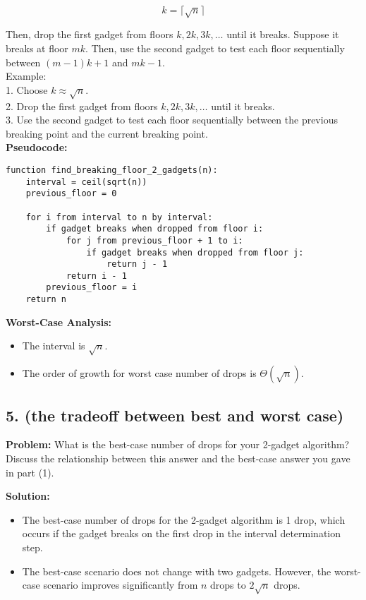\documentclass{article}
\begin{document}
\[
k = \lceil \sqrt{n} \rceil
\]

Then, drop the first gadget from floors \( k, 2k, 3k, \ldots \) until it breaks. Suppose it breaks at floor \( mk \). Then, use the second gadget to test each floor sequentially between \( (m-1)k + 1 \) and \( mk - 1 \).
\\Example:\\
1. Choose \( k \approx \sqrt{n} \).\\
2. Drop the first gadget from floors \( k, 2k, 3k, \ldots \) until it breaks.\\
3. Use the second gadget to test each floor sequentially between the previous breaking point and the current breaking point.
\textbf{\\Pseudocode:}
\begin{verbatim}
function find_breaking_floor_2_gadgets(n):
    interval = ceil(sqrt(n))
    previous_floor = 0

    for i from interval to n by interval:
        if gadget breaks when dropped from floor i:
            for j from previous_floor + 1 to i:
                if gadget breaks when dropped from floor j:
                    return j - 1
            return i - 1
        previous_floor = i
    return n
\end{verbatim}

\textbf{Worst-Case Analysis:}
\begin{itemize}
    \item The interval is \( \sqrt{n} \).
    \item The order of growth for worst case number of drops is \( \Theta(\sqrt{n}) \).
\end{itemize}

\subsection*{5. (the tradeoff between best and worst case)}
\textbf{Problem:} What is the best-case number of drops for your 2-gadget algorithm? Discuss the relationship between this answer and the best-case answer you gave in part (1).

\textbf{Solution:}
\begin{itemize}
    \item The best-case number of drops for the 2-gadget algorithm is 1 drop, which occurs if the gadget breaks on the first drop in the interval determination step.
    \item The best-case scenario does not change with two gadgets. However, the worst-case scenario improves significantly from \( n \) drops to \( 2\sqrt{n} \) drops.
\end{itemize}
\end{document}
